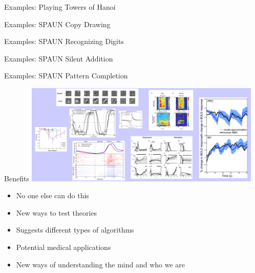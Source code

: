 \documentclass[handout,aspectratio=169]{beamer}
\begin{document}
\begin{frame}{Examples: Playing Towers of Hanoi}
	\centering
\end{frame}

\begin{frame}{Examples: SPAUN Copy Drawing}
	\centering
\end{frame}

\begin{frame}{Examples: SPAUN Recognizing Digits}
	\centering
\end{frame}

\begin{frame}{Examples: SPAUN Silent Addition}
	\centering
\end{frame}

\begin{frame}{Examples: SPAUN Pattern Completion}
	\centering
\end{frame}

\begin{frame}{Benefits}
	\centering
	\vspace{0.25cm}
	\includegraphics[width=0.85\textwidth]{media/compare.png}
	\begin{multicols}{2}
	\begin{itemize}		
		\setlength\itemsep{0.25cm}
		\item No one else can do this
		\item New ways to test theories
		\item Suggests different types of algorithms
		\item Potential medical applications
		\item New ways of understanding the mind and who we are		
	\end{itemize}
	\end{multicols}
\end{frame}
\end{document}
